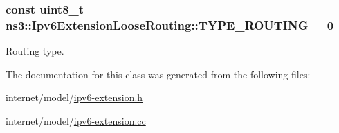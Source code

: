 \subsubsection[{\texorpdfstring{T\+Y\+P\+E\+\_\+\+R\+O\+U\+T\+I\+NG}{TYPE_ROUTING}}]{\setlength{\rightskip}{0pt plus 5cm}const uint8\+\_\+t ns3\+::\+Ipv6\+Extension\+Loose\+Routing\+::\+T\+Y\+P\+E\+\_\+\+R\+O\+U\+T\+I\+NG = 0\hspace{0.3cm}{\ttfamily [static]}}\hypertarget{classns3_1_1Ipv6ExtensionLooseRouting_afd59ae80cc250e69b53195ef96bcfa34}{}\label{classns3_1_1Ipv6ExtensionLooseRouting_afd59ae80cc250e69b53195ef96bcfa34}


Routing type. 



The documentation for this class was generated from the following files\+:\begin{DoxyCompactItemize}
\item 
internet/model/\hyperlink{ipv6-extension_8h}{ipv6-\/extension.\+h}\item 
internet/model/\hyperlink{ipv6-extension_8cc}{ipv6-\/extension.\+cc}\end{DoxyCompactItemize}
